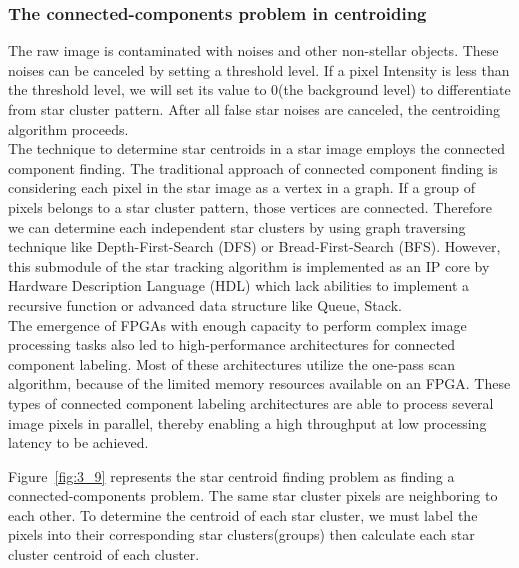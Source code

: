 \subsubsection{The connected-components problem in centroiding}

The raw image is contaminated with noises and other non-stellar objects. These noises can be canceled by setting a threshold level. If a pixel Intensity is less than the threshold level, we will set its value to 0(the background level) to differentiate from star cluster pattern. After all false star noises are canceled, the centroiding algorithm proceeds. \\

\noindent The technique to determine star centroids in a star image employs the connected component finding. The traditional approach of connected component finding is considering each pixel in the star image as a vertex in a graph. If a group of pixels belongs to a star cluster pattern, those vertices are connected. Therefore we can determine each independent star clusters by using graph traversing technique like Depth-First-Search (DFS) or Bread-First-Search (BFS). However, this submodule of the star tracking algorithm is implemented as an IP core by Hardware Description Language (HDL) which lack abilities to implement a recursive function or advanced data structure like Queue, Stack. \\

\noindent The emergence of FPGAs with enough capacity to perform complex image processing tasks also led to high-performance architectures for connected component labeling\cite{CCA}. Most of these architectures utilize the one-pass scan algorithm, because of the limited memory resources available on an FPGA. These types of connected component labeling architectures are able to process several image pixels in parallel, thereby enabling a high throughput at low processing latency to be achieved\cite{000384075100011n.d.}. \\


\noindent Figure~\ref{fig:3_9} represents the star centroid finding problem as finding a connected-components problem. The same star cluster pixels are neighboring to each other. To determine the centroid of each star cluster, we must label the pixels into their corresponding star clusters(groups) then calculate each star cluster centroid of each cluster. \\

